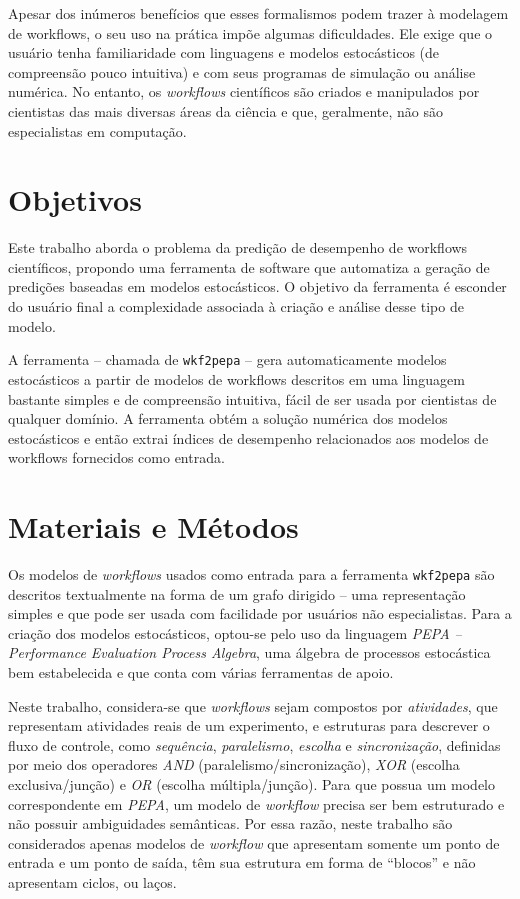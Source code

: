 \documentclass[a4paper,10pt]{article}
\begin{document}
        Apesar dos inúmeros benefícios que esses formalismos podem trazer à modelagem de workflows, o seu uso na prática impõe algumas dificuldades.  Ele exige que o usuário tenha familiaridade com linguagens e modelos estocásticos (de compreensão pouco intuitiva) e com seus programas de simulação ou análise numérica. No entanto, os \emph{workflows} científicos são criados e manipulados por cientistas das mais diversas áreas da ciência e que, geralmente, não são especialistas em computação.

    \section*{Objetivos}

	Este trabalho aborda o problema da predição de desempenho de workflows científicos, propondo uma ferramenta de software que automatiza a geração de predições baseadas em modelos estocásticos. O objetivo da ferramenta é esconder do usuário final a complexidade associada à criação e análise desse tipo de modelo.

	 A ferramenta -- chamada de \texttt{wkf2pepa} -- gera automaticamente modelos estocásticos a partir de modelos de workflows descritos em uma linguagem bastante simples e de compreensão intuitiva, fácil de ser usada por cientistas de qualquer domínio. A ferramenta obtém a solução numérica dos modelos estocásticos e então extrai índices de desempenho relacionados aos modelos de workflows fornecidos como entrada.

    \section*{Materiais e Métodos}

        Os modelos de \emph{workflows} usados como entrada para a ferramenta \texttt{wkf2pepa} são descritos textualmente na forma de um grafo dirigido -- uma representação simples e que pode ser usada com facilidade por usuários não especialistas.
		Para a criação dos modelos estocásticos, optou-se pelo uso da linguagem \emph{PEPA -- Performance Evaluation Process Algebra}, uma álgebra de processos estocástica bem estabelecida e que conta com várias ferramentas de apoio.

         Neste trabalho, considera-se que \emph{workflows} sejam compostos por \emph{atividades}, que representam atividades reais de um experimento, e estruturas para descrever o fluxo de controle, como \emph{sequência}, \emph{paralelismo}, \emph{escolha} e \emph{sincronização}, definidas por meio dos operadores \emph{AND} (paralelismo/sincronização), \emph{XOR} (escolha exclusiva/junção) e \emph{OR} (escolha múltipla/junção).
        Para que possua um modelo correspondente em \emph{PEPA}, um modelo de \emph{workflow} precisa ser bem estruturado e não possuir ambiguidades semânticas. Por essa razão, neste trabalho são considerados apenas modelos de \emph{workflow} que apresentam somente um ponto de entrada e um ponto de saída, têm sua estrutura em forma de ``blocos'' e não apresentam ciclos, ou laços.
\end{document}
